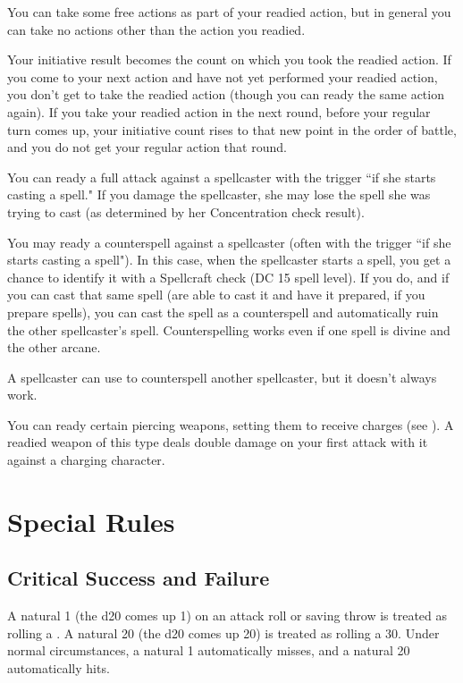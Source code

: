 You can take some free actions as part of your readied action, but in general you can take no actions other than the action you readied.

 Your initiative result becomes the count on which you took the readied action. If you come to your next action and have not yet performed your readied action, you don't get to take the readied action (though you can ready the same action again). If you take your readied action in the next round, before your regular turn comes up, your initiative count rises to that new point in the order of battle, and you do not get your regular action that round.

 You can ready a full attack against a spellcaster with the trigger ``if she starts casting a spell." If you damage
the spellcaster, she may lose the spell she was trying to cast (as determined by her Concentration check result).

 You may ready a counterspell against a spellcaster (often with the trigger ``if she starts casting a spell"). In this case, when the spellcaster starts a spell, you get a chance to identify it with a Spellcraft check (DC 15 \add spell level). If you do, and if you can cast that same spell (are able to cast it and have it prepared, if you prepare spells), you can cast the spell as a counterspell and automatically ruin the other spellcaster's spell. Counterspelling works even if one spell is divine and the other arcane.

A spellcaster can use  to counterspell another spellcaster, but it doesn't always work.

 You can ready certain piercing weapons, setting them to receive charges (see ). A readied weapon of this type deals double damage on your first attack with it against a charging character.

\section{Special Rules}\label{Special Rules}

\subsection{Critical Success and Failure}\label{Critical Success and Failure}
A natural 1 (the d20 comes up 1) on an attack roll or saving throw is treated as rolling a . A natural 20 (the d20 comes up 20) is treated as rolling a 30. Under normal circumstances, a natural 1 automatically misses, and a natural 20 automatically hits.

